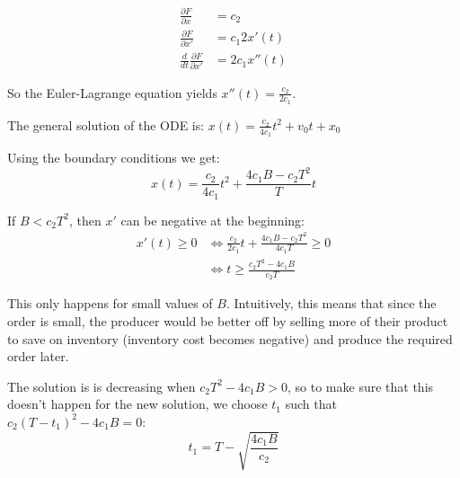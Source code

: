 \documentclass{workbook}
\begin{document}
\begin{solution}
\begin{slide}
\begin{parts}

	\item 
		\begin{align*}
			\frac{\partial F}{\partial x} & = c_2 \\
			\frac{\partial F}{\partial x'} & = c_1 2x'(t) \\
			\frac{d}{dt} \frac{\partial F}{\partial x'} & = 2 c_1 x''(t)
		\end{align*}

		So the Euler-Lagrange equation yields $x''(t) = \frac{c_2}{2c_1}$.
		
	\item 		The general solution of the ODE is: 
			$x(t) = \frac{c_2}{4c_1} t^2 + v_0 t + x_0$
			
		Using the boundary conditions we get:
			\[x(t) = \frac{c_2}{4c_1} t^2 + \frac{4c_1 B-c_2 T^2}{T} t\]

	\item 		If $B < c_2 T^2$, then $x'$ can be negative at the beginning:
		\begin{align*}
			x'(t) \geq 0 	
				& \Leftrightarrow \frac{c_2}{2c_1} t + \frac{4c_1 B-c_2 T^2}{4c_1 T} \geq 0 \\
				& \Leftrightarrow t \geq \frac{c_2 T^2 - 4c_1 B}{c_2T}	
		\end{align*}
		
		This only happens for small values of $B$. Intuitively, this means that since the order is small, the producer would be better off by selling more of their product to save on inventory (inventory cost becomes negative) and produce the required order later.


	
\end{parts}

\end{slide}	



\begin{slide}
\begin{parts}
	\setcounter{partsitem}{3}

	\item The solution is is decreasing when $c_2 T^2 - 4c_1 B > 0$, so to make sure that this doesn't happen for the new solution, we choose $t_1$ such that $c_2 (T-t_1)^2 - 4c_1 B=0$:
		\[ t_1 = T - \sqrt{ \frac{4c_1 B}{c_2}} \]
	

\end{parts}
\end{slide}
\end{solution}
\end{document}
